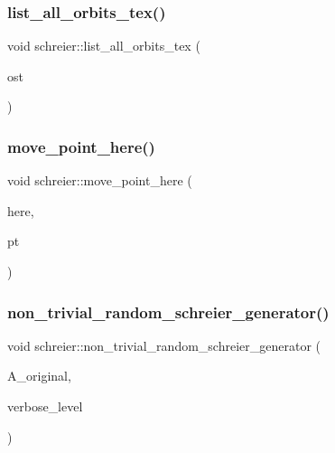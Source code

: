 \mbox{\label{classschreier_ab75c2415d4b4afa3a1a713f08ec6e5f6}} 
\subsubsection{\texorpdfstring{list\+\_\+all\+\_\+orbits\+\_\+tex()}{list\_all\_orbits\_tex()}}
{\footnotesize\ttfamily void schreier\+::list\+\_\+all\+\_\+orbits\+\_\+tex (\begin{DoxyParamCaption}\item[{ostream \&}]{ost }\end{DoxyParamCaption})}

\mbox{\label{classschreier_a1df8fa2329898d26266aecd51363e89b}} 
\subsubsection{\texorpdfstring{move\+\_\+point\+\_\+here()}{move\_point\_here()}}
{\footnotesize\ttfamily void schreier\+::move\+\_\+point\+\_\+here (\begin{DoxyParamCaption}\item[{\mbox{\hyperlink{galois_8h_a09fddde158a3a20bd2dcadb609de11dc}{I\+NT}}}]{here,  }\item[{\mbox{\hyperlink{galois_8h_a09fddde158a3a20bd2dcadb609de11dc}{I\+NT}}}]{pt }\end{DoxyParamCaption})}

\mbox{\label{classschreier_a9077ff6a0c61629d6e73aeb56b39a6a0}} 
\subsubsection{\texorpdfstring{non\+\_\+trivial\+\_\+random\+\_\+schreier\+\_\+generator()}{non\_trivial\_random\_schreier\_generator()}}
{\footnotesize\ttfamily void schreier\+::non\+\_\+trivial\+\_\+random\+\_\+schreier\+\_\+generator (\begin{DoxyParamCaption}\item[{\mbox{\hyperlink{classaction}{action}} $\ast$}]{A\+\_\+original,  }\item[{\mbox{\hyperlink{galois_8h_a09fddde158a3a20bd2dcadb609de11dc}{I\+NT}}}]{verbose\+\_\+level }\end{DoxyParamCaption})}

